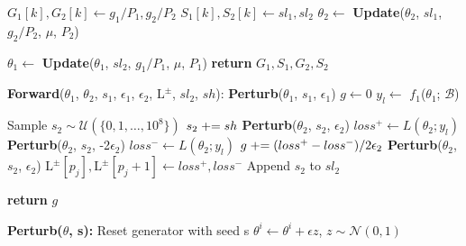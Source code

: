 \begin{algorithm}[]
\begin{algorithmic}[1]
\ENDFOR

\STATE $G_{1}[k], G_{2}[k] \gets  g_{1} / P_{1}, g_{2} / P_{2}$
\STATE $S_{1}[k], S_{2}[k] \gets  sl_{1}, sl_{2}$
\STATE $\theta_{2} \gets$ \textbf{Update}($\theta_{2}$, $sl_{1}$, $g_{2}/ P_{2}$, $\mu$, $P_{2}$) 

\STATE $\theta_{1} \gets$ \textbf{Update}($\theta_{1}$, $sl_{2}$, $g_{1}/P_{1}$, $\mu$, $P_{1}$) %
\ENDFOR
\STATE \textbf{return} $G_{1}, S_{1}, G_{2}, S_{2}$ 
\STATE 

\STATE {}
\STATE \textbf{Forward}($\theta_{1}$, $\theta_{2}$, $s_{1}$, $\epsilon_{1}$, $\epsilon_{2}$, $\text{L}^{\pm}$, $sl_{2}$, $sh$):
    \STATE \textbf{Perturb}($\theta_{1}$, $s_{1}$, $\epsilon_{1}$) 
    \STATE $g \gets 0$
    \STATE $y_{l} \gets$ $f_{1}$($\theta_{1}$; $\mathcal{B}$)
    
    \STATE Sample $s_{2} \sim \mathcal{U}(\{0, 1, \dots, 10^{8}\})$
    \STATE $s_{2} \mathrel{+}= sh$
    \STATE \textbf{Perturb}($\theta_{2}$, $s_{2}$, $\epsilon_{2}$) 
    \STATE $loss^{+} \gets L(\theta_{2}; y_{l})$
    \STATE \textbf{Perturb}($\theta_{2}$, $s_{2}$, -2$\epsilon_{2}$) 
    \STATE $loss^{-} \gets L(\theta_{2}; y_{l})$
    \STATE $g \mathrel{+}= (loss^{+} - loss^{-}) / 2\epsilon_{2}$ 
    \STATE \textbf{Perturb}($\theta_{2}$, $s_{2}$, $\epsilon_{2}$) 
    \STATE $\text{L}^{\pm}[p_{j}], \text{L}^{\pm}[p_{j} + 1]  \gets loss^{+}, loss^{-}$
    \STATE Append $s_{2}$ to $sl_{2}$
    
    \ENDFOR
    \STATE \textbf{return} $g$

\STATE

\STATE \textbf{Perturb($\theta$, s):}
\STATE Reset generator with seed s
    \STATE \hspace{1em} $\theta^{i} \gets \theta^{i} + \epsilon z$, $z \sim \mathcal{N} (0, 1)$
\ENDFOR

\end{algorithmic}
\label{alg:fl_client}
\end{algorithm}
